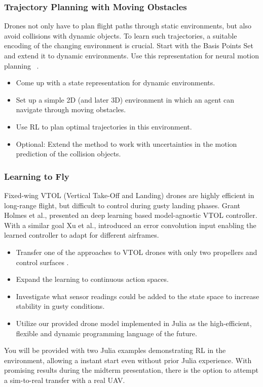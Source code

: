\documentclass[a4paper]{article}
\begin{document}
\subsubsection{Trajectory Planning with Moving Obstacles}
Drones not only have to plan flight paths through static environments, but also avoid collisions with dynamic objects.
To learn such trajectories, a suitable encoding of the changing environment is crucial.
Start with the Basis Points Set ~\cite{Prokudin2019} and extend it to dynamic environments.
Use this representation for neural motion planning ~\cite{Qureshi2019}.

\begin{itemize}
  \item Come up with a state representation for dynamic environments.
  \item Set up a simple 2D (and later 3D) environment in which an agent can navigate through moving obstacles.
  \item Use RL to plan optimal trajectories in this environment.
  \item Optional: Extend the method to work with uncertainties in the motion prediction of the collision objects.
\end{itemize}

\subsubsection{Learning to Fly}
Fixed-wing VTOL (Vertical Take-Off and Landing) drones are highly efficient in long-range flight, but difficult to control during gusty landing phases.
Grant Holmes et al., \cite{ModelAgnosticVTOL} presented an deep learning based model-agnostic VTOL controller. With a similar goal Xu et al., \cite{LearningToFly} introduced an error convolution input enabling the learned controller to adapt for different airframes.
\begin{itemize}
  \item Transfer one of the approaches to VTOL drones with only two propellers and control surfaces  \cite{ElectraVTOL}.
  \item Expand the learning to continuous action spaces.
  \item Investigate what sensor readings could be added to the state space to increase stability in gusty conditions.
  \item Utilize our provided drone model implemented in Julia as the high-efficient, flexible and dynamic programming language of the future.
\end{itemize}
You will be provided with two Julia examples demonstrating RL in the environment, allowing a instant start even without prior Julia experience.
With promising results during the midterm presentation, there is the option to attempt a sim-to-real transfer with a real UAV.
\end{document}
